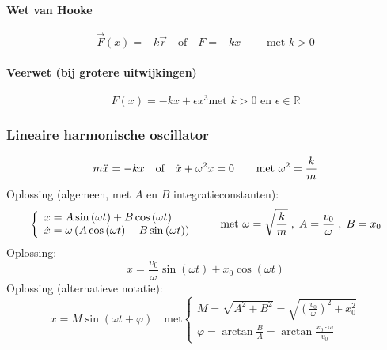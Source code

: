 \paragraph{Wet van Hooke}
\[
  \vec{F}(x) = - k \vec{r} \quad \mbox{of} \quad F = -kx \qquad \mbox{ met } k > 0
\]
\paragraph{Veerwet (bij grotere uitwijkingen)}
\[
 F(x) = -kx + \epsilon x^3 \mbox{met } k > 0 \mbox{ en } \epsilon \in \mathbb{R} 
\]

\subsubsection{Lineaire harmonische oscillator}
\[
  m\ddot{x} = -kx  \quad \mbox{of} \quad
  \ddot{x} + \omega^2 x = 0 \qquad \mbox{met } \omega^2 = \frac{k}{m}      
\]
Oplossing (algemeen, met $A$ en $B$ integratieconstanten):
\[
  \left\{
    \begin{array}{l}
          x  = A \sin \left(\omega t \right) + B \cos \left(\omega t \right)\\
      \dot{x} = \omega\left(A \cos \left(\omega t \right) - B \sin \left(\omega t \right)\right)
    \end{array}
  \right. 
    \qquad \mbox{met } \omega = \sqrt{\frac{k}{m}} \; , \; A = \frac{v_0}{\omega} \; , \; B = x_0
\]
Oplossing:
\[
  x = \frac{v_0}{\omega} \sin \left(\omega t \right) + x_0 \cos \left(\omega t \right)
\]
Oplossing (alternatieve notatie):
\[
  x = M \sin \left( \omega t + \varphi \right)
  \quad \mbox {met}
  \left\{
    \begin{array}{l}
      M = \sqrt{A^2 + B^2} = \sqrt{\left(\frac{v_0}{\omega}\right)^2 + x_0^2}\\
      \varphi = \arctan \frac{B}{A} = \arctan \frac{x_0 \cdot \omega}{v_0}
    \end{array}
  \right.
\]

\newpage
